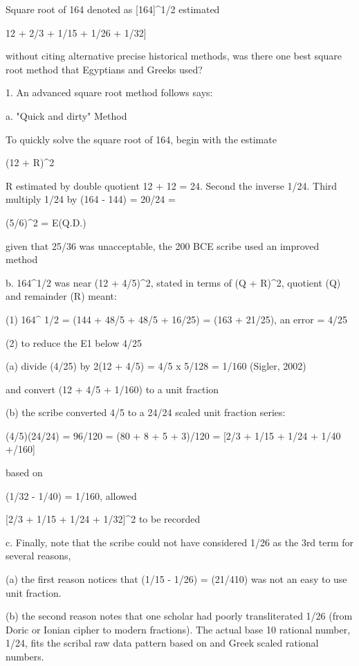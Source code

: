 \documentclass[12pt]{article}
\begin{document}
Square root of 164 denoted as [164]^1/2 estimated {12 + 2/3 + 1/15 + 1/26 + 1/32]

without citing alternative precise historical methods, was there one best square root method that Egyptians and Greeks used?

1. An advanced square root method follows  says:


a. "Quick and dirty" Method

To quickly solve the square root of 164, begin with the estimate

(12 + R)^2 

R estimated by double quotient 12 + 12 = 24. Second the inverse 1/24. Third multiply 1/24 by (164 - 144) = 20/24 = 

(5/6)^2 = E(Q.D.)

given that 25/36 was unacceptable, the 200 BCE scribe used an improved method

b. 164^1/2 was near (12 + 4/5)^2, stated in terms of (Q + R)^2, quotient (Q) and remainder (R) meant:

(1) 164^ 1/2 = (144 + 48/5 + 48/5 + 16/25) = (163 + 21/25), an error = 4/25  

(2) to reduce the E1 below 4/25 

(a) divide (4/25) by 2(12 + 4/5) = 4/5 x 5/128 =  1/160  (Sigler, 2002)

and convert (12 + 4/5 + 1/160) to a unit fraction

(b) the scribe converted 4/5 to a 24/24 scaled unit fraction series:

(4/5)(24/24) = 96/120 = (80 + 8 + 5 + 3)/120 = [2/3 + 1/15 + 1/24 + 1/40 +/160]

based on

(1/32 - 1/40) = 1/160, allowed

[2/3 + 1/15 + 1/24 + 1/32]^2 to be recorded  

c. Finally, note that the scribe could not have considered 1/26 as the 3rd term for several reasons, 

(a) the first reason notices that (1/15 - 1/26) = (21/410) was not an easy to use unit fraction. 

(b) the second reason notes that one scholar had poorly transliterated 1/26 (from Doric or Ionian cipher to modern fractions). The actual base 10 rational number, 1/24, fits the scribal raw data pattern based on  and Greek scaled rational numbers.

}
\end{document}
